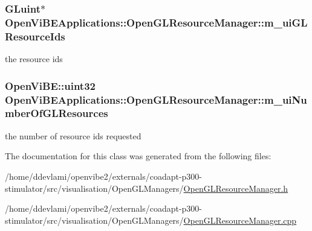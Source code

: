 \hypertarget{classOpenViBEApplications_1_1OpenGLResourceManager_a2548a35c6cdacba3f3f162b57fc35065}{
\subsubsection[{m\_\-uiGLResourceIds}]{\setlength{\rightskip}{0pt plus 5cm}GLuint$\ast$ {\bf OpenViBEApplications::OpenGLResourceManager::m\_\-uiGLResourceIds}}}
\label{classOpenViBEApplications_1_1OpenGLResourceManager_a2548a35c6cdacba3f3f162b57fc35065}
the resource ids \hypertarget{classOpenViBEApplications_1_1OpenGLResourceManager_ae11c8b4262f44ded66fdc1a5751c9327}{
\subsubsection[{m\_\-uiNumberOfGLResources}]{\setlength{\rightskip}{0pt plus 5cm}OpenViBE::uint32 {\bf OpenViBEApplications::OpenGLResourceManager::m\_\-uiNumberOfGLResources}}}
\label{classOpenViBEApplications_1_1OpenGLResourceManager_ae11c8b4262f44ded66fdc1a5751c9327}
the number of resource ids requested 

The documentation for this class was generated from the following files:\begin{DoxyCompactItemize}
\item 
/home/ddevlami/openvibe2/externals/coadapt-\/p300-\/stimulator/src/visualisation/OpenGLManagers/\hyperlink{OpenGLResourceManager_8h}{OpenGLResourceManager.h}\item 
/home/ddevlami/openvibe2/externals/coadapt-\/p300-\/stimulator/src/visualisation/OpenGLManagers/\hyperlink{OpenGLResourceManager_8cpp}{OpenGLResourceManager.cpp}\end{DoxyCompactItemize}
